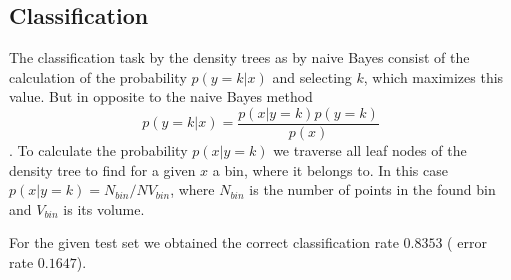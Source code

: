 \documentclass{article}
\begin{document}
\subsection{Classification}

The classification task by the density trees as by naive Bayes consist of the calculation of the probability $p(y=k|x)$ and selecting $k$, which maximizes this value. But in opposite to the naive Bayes method 
$$p(y=k|x)=\frac{p(x|y=k) p(y=k)}{p(x)}$$. To calculate the probability $p(x|y=k)$ we traverse all leaf nodes of the density tree to find for a given $x$ a bin, where it belongs to. In this case $p(x|y=k) = N_{bin}/{NV_{bin}}$, where $N_{bin}$ is the number of points in the found bin and $V_{bin}$ is its volume.

For the given test set we obtained the correct classification rate $0.8353$ ( error rate $0.1647$). 
\end{document}
